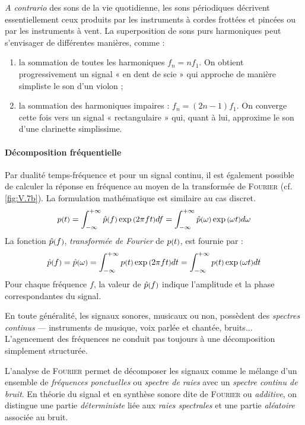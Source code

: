 \textit{A contrario} des sons de la vie quotidienne, les sons périodiques décrivent essentiellement ceux produits par les instruments à cordes frottées et pincées ou par les instruments à vent.
La superposition de sons purs harmoniques peut s'envisager de différentes manières, comme :
\begin{enumerate}
\item la sommation de toutes les harmoniques $f_{n} = n f_{1}$. On obtient progressivement un signal « en dent de scie » qui approche de manière simpliste le son d'un violon ;
\item la sommation des harmoniques impaires : $f_{n} = (2n - 1) f_{1}$. On conver\-ge cette fois vers un signal « rectangulaire » qui, quant à lui, approxime le son d'une clarinette simplissime.
\end{enumerate}

\paragraph*{Décomposition fréquentielle} Par dualité temps-fréquen\-ce et pour un signal continu, il est également possible de calculer la réponse en fréquence au moyen de la transformée de \textsc{Fourier} (cf. \cref{fig:V.7b}). 
La formulation mathématique est similaire au cas discret.
\begin{equation}
p\mbox{\footnotesize (} t \mbox{\footnotesize )} = \int_{-\infty}^{+\infty} \hat{p}\mbox{\footnotesize (} f \mbox{\footnotesize )}\exp\mbox{\footnotesize (} 2\pi ft \mbox{\footnotesize )}df = \int_{-\infty}^{+\infty} \hat{p}\mbox{\footnotesize (} \omega \mbox{\footnotesize )}\exp\mbox{\footnotesize (} \omega t \mbox{\footnotesize )}d\omega
\end{equation}
La fonction $\hat{p}\mbox{\footnotesize (} f \mbox{\footnotesize )}$, \emph{transformée de Fourier} de $p\mbox{\footnotesize (} t \mbox{\footnotesize )}$, est fournie par :
\begin{equation}
\hat{p}\mbox{\footnotesize (} f \mbox{\footnotesize )} = \hat{p}\mbox{\footnotesize (} \omega \mbox{\footnotesize )} = \int_{-\infty}^{+\infty} p\mbox{\footnotesize (} t \mbox{\footnotesize )}\exp\mbox{\footnotesize (} 2\pi ft \mbox{\footnotesize )}dt = \int_{-\infty}^{+\infty} p\mbox{\footnotesize (} t \mbox{\footnotesize )}\exp\mbox{\footnotesize (} \omega t \mbox{\footnotesize )}dt
\end{equation}
Pour chaque fréquence $f$, la valeur de $\hat{p}\mbox{\footnotesize (} f \mbox{\footnotesize )}$ indique l'amplitude et la phase correspondantes du signal.

En toute généralité, les signaux sonores, musicaux ou non, possèdent des \emph{spectres continus} --- instruments de musique, voix parlée et chantée, bruits... L'agencement des fréquences ne conduit pas toujours à une décomposition simplement structurée.

L'analyse de \textsc{Fourier} permet de décomposer les signaux comme le mélange d'un ensemble de \emph{fréquences ponctuelles} ou \emph{spectre de raies} avec un \emph{spectre continu de bruit}. 
En théorie du signal et en synthèse sonore dite de \textsc{Fourier} ou \emph{additive}, on distingue une partie \emph{déterministe} liée aux \emph{raies spectrales} et une partie \emph{aléatoire} associée au bruit.


